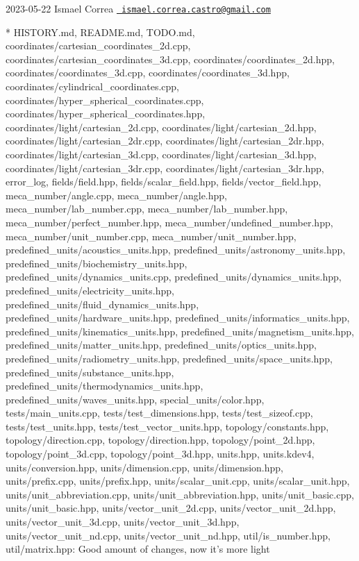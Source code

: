  2023-\/05-\/22 Ismael Correa \href{mailto:ismael.correa.castro@gmail.com}{\texttt{ ismael.\+correa.\+castro@gmail.\+com}} \begin{DoxyVerb}* HISTORY.md, README.md, TODO.md,
coordinates/cartesian_coordinates_2d.cpp,
coordinates/cartesian_coordinates_3d.cpp,
coordinates/coordinates_2d.hpp, coordinates/coordinates_3d.cpp,
coordinates/coordinates_3d.hpp,
coordinates/cylindrical_coordinates.cpp,
coordinates/hyper_spherical_coordinates.cpp,
coordinates/hyper_spherical_coordinates.hpp,
coordinates/light/cartesian_2d.cpp,
coordinates/light/cartesian_2d.hpp,
coordinates/light/cartesian_2dr.cpp,
coordinates/light/cartesian_2dr.hpp,
coordinates/light/cartesian_3d.cpp,
coordinates/light/cartesian_3d.hpp,
coordinates/light/cartesian_3dr.cpp,
coordinates/light/cartesian_3dr.hpp, error_log, fields/field.hpp,
fields/scalar_field.hpp, fields/vector_field.hpp,
meca_number/angle.cpp, meca_number/angle.hpp,
meca_number/lab_number.cpp, meca_number/lab_number.hpp,
meca_number/perfect_number.hpp, meca_number/undefined_number.hpp,
meca_number/unit_number.cpp, meca_number/unit_number.hpp,
predefined_units/acoustics_units.hpp,
predefined_units/astronomy_units.hpp,
predefined_units/biochemistry_units.hpp,
predefined_units/dynamics_units.cpp,
predefined_units/dynamics_units.hpp,
predefined_units/electricity_units.hpp,
predefined_units/fluid_dynamics_units.hpp,
predefined_units/hardware_units.hpp,
predefined_units/informatics_units.hpp,
predefined_units/kinematics_units.hpp,
predefined_units/magnetism_units.hpp,
predefined_units/matter_units.hpp,
predefined_units/optics_units.hpp,
predefined_units/radiometry_units.hpp,
predefined_units/space_units.hpp,
predefined_units/substance_units.hpp,
predefined_units/thermodynamics_units.hpp,
predefined_units/waves_units.hpp, special_units/color.hpp,
tests/main_units.cpp, tests/test_dimensions.hpp,
tests/test_sizeof.cpp, tests/test_units.hpp,
tests/test_vector_units.hpp, topology/constants.hpp,
topology/direction.cpp, topology/direction.hpp,
topology/point_2d.hpp, topology/point_3d.cpp,
topology/point_3d.hpp, units.hpp, units.kdev4,
units/conversion.hpp, units/dimension.cpp, units/dimension.hpp,
units/prefix.cpp, units/prefix.hpp, units/scalar_unit.cpp,
units/scalar_unit.hpp, units/unit_abbreviation.cpp,
units/unit_abbreviation.hpp, units/unit_basic.cpp,
units/unit_basic.hpp, units/vector_unit_2d.cpp,
units/vector_unit_2d.hpp, units/vector_unit_3d.cpp,
units/vector_unit_3d.hpp, units/vector_unit_nd.cpp,
units/vector_unit_nd.hpp, util/is_number.hpp, util/matrix.hpp: Good
amount of changes, now it's more light
\end{DoxyVerb}
